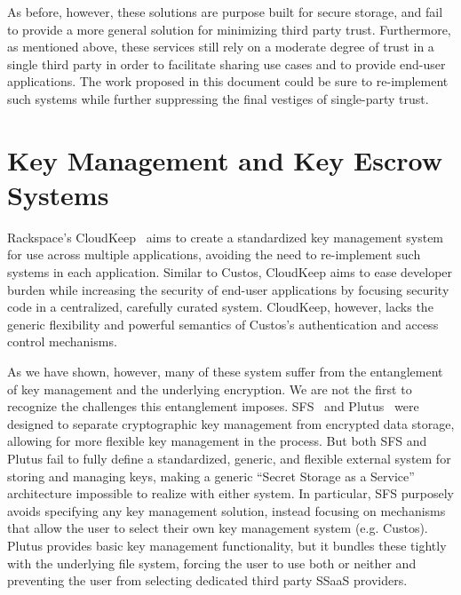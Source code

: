 As before, however, these solutions are purpose built for secure
storage, and fail to provide a more general solution for minimizing
third party trust. Furthermore, as mentioned above, these services
still rely on a moderate degree of trust in a single third party in
order to facilitate sharing use cases and to provide end-user
applications. The work proposed in this document could be sure to
re-implement such systems while further suppressing the final vestiges
of single-party trust.

\section{Key Management and Key Escrow Systems}
\label{chap:related:keymgmt}

\cite{blaze1996, denning1996}
\cite{cloudkeep-presentation, cloudkeep}
\cite{gazzang, porticor, rosen2012}
\cite{amazon-hsm}

Rackspace's CloudKeep~\cite{cloudkeep} aims to create a standardized
key management system for use across multiple applications, avoiding
the need to re-implement such systems in each application. Similar to
Custos, CloudKeep aims to ease developer burden while increasing the
security of end-user applications by focusing security code in a
centralized, carefully curated system. CloudKeep, however, lacks the
generic flexibility and powerful semantics of Custos's authentication
and access control mechanisms.

As we have shown, however, many
of these system suffer from the entanglement of key management and the
underlying encryption. We are not the first to recognize the
challenges this entanglement imposes. SFS~\cite{mazieres1999} and
Plutus~\cite{kallahalla2003} were designed to separate cryptographic
key management from encrypted data storage, allowing for more flexible
key management in the process. But both SFS and Plutus fail to fully
define a standardized, generic, and flexible external system for
storing and managing keys, making a generic ``Secret Storage as a
Service'' architecture impossible to realize with either system. In
particular, SFS purposely avoids specifying any key management
solution, instead focusing on mechanisms that allow the user to select
their own key management system (e.g. Custos). Plutus provides basic
key management functionality, but it bundles these tightly with the
underlying file system, forcing the user to use both or neither and
preventing the user from selecting dedicated third party SSaaS
providers.


